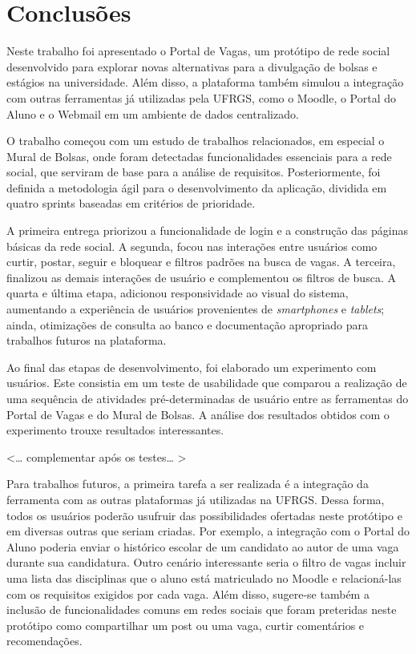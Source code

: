 \chapter{Conclusões}
\label{conclusao}

Neste trabalho foi apresentado o Portal de Vagas, um protótipo de rede social desenvolvido para explorar novas alternativas para a divulgação de bolsas e estágios na universidade. Além disso, a plataforma também simulou a integração com outras ferramentas já utilizadas pela UFRGS, como o Moodle, o Portal do Aluno e o Webmail em um ambiente de dados centralizado.

O trabalho começou com um estudo de trabalhos relacionados, em especial o Mural de Bolsas, onde foram detectadas funcionalidades essenciais para a rede social, que serviram de base para a análise de requisitos. Posteriormente, foi definida a metodologia ágil para o desenvolvimento da aplicação, dividida em quatro sprints baseadas em critérios de prioridade. 

A primeira entrega priorizou a funcionalidade de login e a construção das páginas básicas da rede social. A segunda, focou nas interações entre usuários como curtir, postar, seguir e bloquear e filtros padrões na busca de vagas. A terceira, finalizou as demais interações de usuário e complementou os filtros de busca. A quarta e última etapa, adicionou responsividade ao visual do sistema, aumentando a experiência de usuários provenientes de \textit{smartphones} e \textit{tablets}; ainda, otimizações de consulta ao banco e documentação apropriado para trabalhos futuros na plataforma.

Ao final das etapas de desenvolvimento, foi elaborado um experimento com usuários. Este consistia em um teste de usabilidade que comparou a realização de uma sequência de atividades pré-determinadas de usuário entre as ferramentas do Portal de Vagas e do Mural de Bolsas. A análise dos resultados obtidos com o experimento trouxe resultados interessantes.

<… complementar após os testes… >


Para trabalhos futuros, a primeira tarefa a ser realizada é a integração da ferramenta com as outras plataformas já utilizadas na UFRGS. Dessa forma, todos os usuários poderão usufruir das possibilidades ofertadas neste protótipo e em diversas outras que seriam criadas. Por exemplo, a integração com o Portal do Aluno poderia enviar o histórico escolar de um candidato ao autor de uma vaga durante sua candidatura. Outro cenário interessante seria o filtro de vagas incluir uma lista das disciplinas que o aluno está matriculado no Moodle e relacioná-las com os requisitos exigidos por cada vaga. Além disso, sugere-se também a inclusão de funcionalidades comuns em redes sociais que foram preteridas neste protótipo como compartilhar um post ou uma vaga, curtir comentários e recomendações.